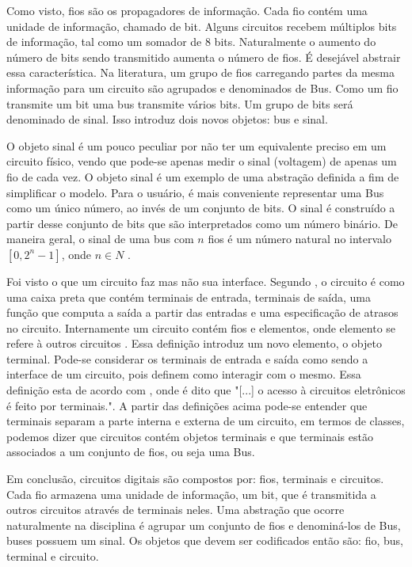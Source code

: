 Como visto, fios são os propagadores de informação.
Cada fio contém uma unidade de informação, chamado de bit.
Alguns circuitos recebem múltiplos bits de informação, tal como um somador de 8 bits.
Naturalmente o aumento do número de bits sendo transmitido aumenta o número de fios.
É desejável abstrair essa característica.
Na literatura, um grupo de fios carregando partes da mesma informação para um circuito são agrupados e denominados de Bus.
Como um fio transmite um bit uma bus transmite vários bits.
Um grupo de bits será denominado de sinal.
Isso introduz dois novos objetos: bus e sinal.

O objeto sinal é um pouco peculiar por não ter um equivalente preciso em um circuito físico, vendo que pode-se apenas medir o sinal (voltagem) de apenas um fio de cada vez.
O objeto sinal é um exemplo de uma abstração definida a fim de simplificar o modelo.
Para o usuário, é mais conveniente representar uma Bus como um único número, ao invés de um conjunto de bits.
O sinal é construído a partir desse conjunto de bits que são interpretados como um número binário.
De maneira geral, o sinal de uma bus com $n$ fios é um número natural no intervalo $[0,2^n -1]$, onde $n \in N $ \cite{harris}.

Foi visto o que um circuito faz mas não sua interface.
Segundo \textcite{harris}, o circuito é como uma caixa preta que contém terminais de entrada, terminais de saída, uma função que computa a saída a partir das entradas e uma especificação de atrasos no circuito.
Internamente um circuito contém fios e elementos, onde elemento se refere à outros circuitos \cite{harris}.
Essa definição introduz um novo elemento, o objeto terminal.
Pode-se considerar os terminais de entrada e saída como sendo a interface de um circuito, pois definem como interagir com o mesmo.
Essa definição esta de acordo com \textcite{kaufman}, onde é dito que "[...] o acesso à circuitos eletrônicos é feito por terminais.".
A partir das definições acima pode-se entender que terminais separam a parte interna e externa de um circuito, em termos de classes, podemos dizer que circuitos contém objetos terminais e que terminais estão associados a um conjunto de fios, ou seja uma Bus.

Em conclusão, circuitos digitais são compostos por: fios, terminais e circuitos.
Cada fio armazena uma unidade de informação, um bit, que é transmitida a outros circuitos através de terminais neles.
Uma abstração que ocorre naturalmente na disciplina é agrupar um conjunto de fios e denominá-los de Bus, buses possuem um sinal.
Os objetos que devem ser codificados então são: fio, bus, terminal e circuito.

